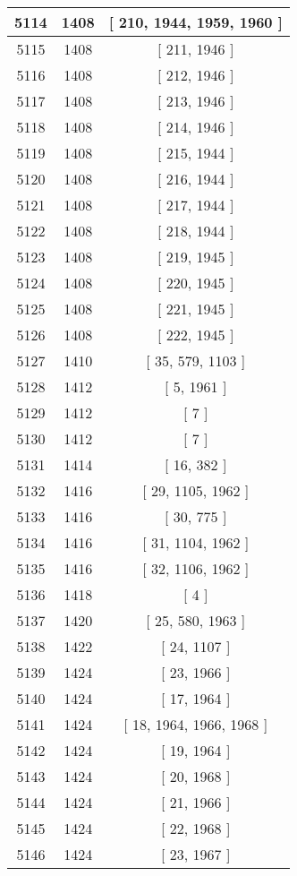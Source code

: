 \begin{center}
\begin{longtable}[H]{|| c c c ||}
\hline
5114 & 1408 & [ 210, 1944, 1959, 1960 ] \\ 
\hline
5115 & 1408 & [ 211, 1946 ] \\ 
\hline
5116 & 1408 & [ 212, 1946 ] \\ 
\hline
5117 & 1408 & [ 213, 1946 ] \\ 
\hline
5118 & 1408 & [ 214, 1946 ] \\ 
\hline
5119 & 1408 & [ 215, 1944 ] \\ 
\hline
5120 & 1408 & [ 216, 1944 ] \\ 
\hline
5121 & 1408 & [ 217, 1944 ] \\ 
\hline
5122 & 1408 & [ 218, 1944 ] \\ 
\hline
5123 & 1408 & [ 219, 1945 ] \\ 
\hline
5124 & 1408 & [ 220, 1945 ] \\ 
\hline
5125 & 1408 & [ 221, 1945 ] \\ 
\hline
5126 & 1408 & [ 222, 1945 ] \\ 
\hline
5127 & 1410 & [ 35, 579, 1103 ] \\ 
\hline
5128 & 1412 & [ 5, 1961 ] \\ 
\hline
5129 & 1412 & [ 7 ] \\ 
\hline
5130 & 1412 & [ 7 ] \\ 
\hline
5131 & 1414 & [ 16, 382 ] \\ 
\hline
5132 & 1416 & [ 29, 1105, 1962 ] \\ 
\hline
5133 & 1416 & [ 30, 775 ] \\ 
\hline
5134 & 1416 & [ 31, 1104, 1962 ] \\ 
\hline
5135 & 1416 & [ 32, 1106, 1962 ] \\ 
\hline
5136 & 1418 & [ 4 ] \\ 
\hline
5137 & 1420 & [ 25, 580, 1963 ] \\ 
\hline
5138 & 1422 & [ 24, 1107 ] \\ 
\hline
5139 & 1424 & [ 23, 1966 ] \\ 
\hline
5140 & 1424 & [ 17, 1964 ] \\ 
\hline
5141 & 1424 & [ 18, 1964, 1966, 1968 ] \\ 
\hline
5142 & 1424 & [ 19, 1964 ] \\ 
\hline
5143 & 1424 & [ 20, 1968 ] \\ 
\hline
5144 & 1424 & [ 21, 1966 ] \\ 
\hline
5145 & 1424 & [ 22, 1968 ] \\ 
\hline
5146 & 1424 & [ 23, 1967 ] \\ 

\end{longtable}
\end{center}
